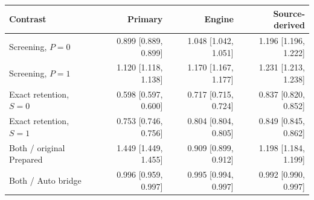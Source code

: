 \begin{tabular}{lrrr}
\toprule
Contrast & Primary & Engine & Source-derived \\
\midrule
Screening, $P=0$ & 0.899 [0.889, 0.899] & 1.048 [1.042, 1.051] & 1.196 [1.196, 1.222] \\
Screening, $P=1$ & 1.120 [1.118, 1.138] & 1.170 [1.167, 1.177] & 1.231 [1.213, 1.238] \\
Exact retention, $S=0$ & 0.598 [0.597, 0.600] & 0.717 [0.715, 0.724] & 0.837 [0.820, 0.852] \\
Exact retention, $S=1$ & 0.753 [0.746, 0.756] & 0.804 [0.804, 0.805] & 0.849 [0.845, 0.862] \\
Both / original Prepared & 1.449 [1.449, 1.455] & 0.909 [0.899, 0.912] & 1.198 [1.184, 1.199] \\
Both / Auto bridge & 0.996 [0.959, 0.997] & 0.995 [0.994, 0.997] & 0.992 [0.990, 0.997] \\
\bottomrule
\end{tabular}
